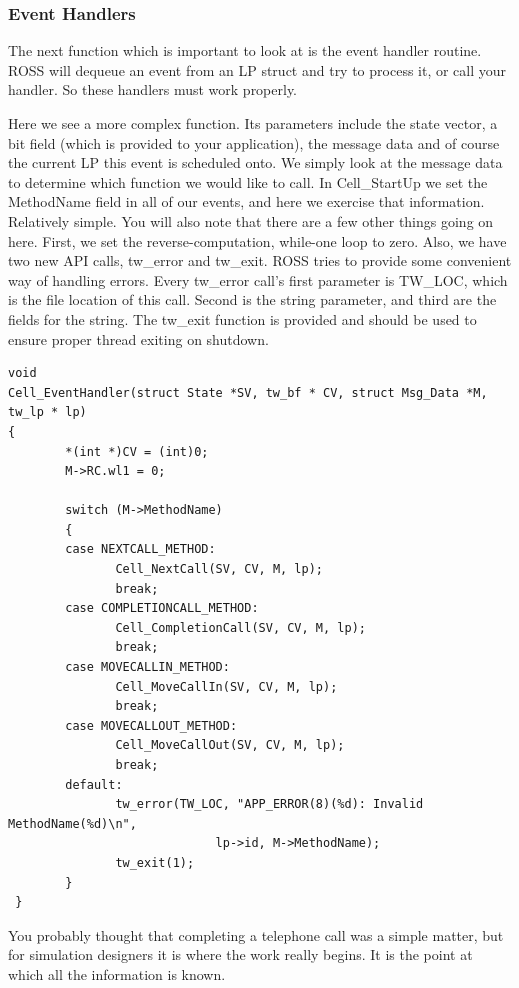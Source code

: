 \documentclass[12pt]{article}
\begin{document}
 
\subsubsection{Event Handlers}
The next function which is important to look at is the event handler
routine.  ROSS will dequeue an event from an LP struct and try to
process it, or call your handler.  So these handlers must work
properly.

Here we see a more complex function.  Its parameters include the state vector,
a bit field (which is provided to your application), the message data and of
course the current LP this event is scheduled onto.  We simply look at the
message data to determine which function we would like to call.  In
Cell\_StartUp we set the MethodName field in all of our events, and here we
exercise that information.  Relatively simple.  You will also note that there
are a few other things going on here.  First, we set the reverse-computation,
while-one loop to zero.  Also, we have two new API calls, tw\_error and
tw\_exit.  ROSS tries to provide some convenient way of handling errors.
Every tw\_error call's first parameter is TW\_LOC, which is the file location
of this call.  Second is the string parameter, and third are the fields for
the string.  The tw\_exit function is provided and should be used to ensure
proper thread exiting on shutdown.

\begin{verbatim}
void
Cell_EventHandler(struct State *SV, tw_bf * CV, struct Msg_Data *M, tw_lp * lp)
{
        *(int *)CV = (int)0;
        M->RC.wl1 = 0;

        switch (M->MethodName)
        {
        case NEXTCALL_METHOD:
               Cell_NextCall(SV, CV, M, lp);
               break;
        case COMPLETIONCALL_METHOD:
               Cell_CompletionCall(SV, CV, M, lp);
               break;
        case MOVECALLIN_METHOD:
               Cell_MoveCallIn(SV, CV, M, lp);
               break;
        case MOVECALLOUT_METHOD:
               Cell_MoveCallOut(SV, CV, M, lp);
               break;
        default:
               tw_error(TW_LOC, "APP_ERROR(8)(%d): Invalid MethodName(%d)\n",
                             lp->id, M->MethodName);
               tw_exit(1);
        }
 }
\end{verbatim}
 
You probably thought that completing a telephone call was a simple
matter, but for simulation designers it is where the work really
begins.  It is the point at which all the information is known.
\end{document}

